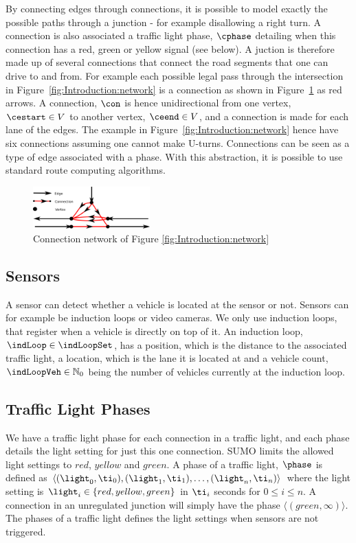 By connecting edges through connections, it is possible to model exactly the possible paths through a junction - for example disallowing a right turn.
A connection is also associated a traffic light phase, $\cphase$ detailing when this connection has a red, green or yellow signal (see below).
A juction is therefore made up of several connections that connect the road segments that one can drive to and from.
For example each possible legal pass through the intersection in Figure~\ref{fig:Introduction:network} is a connection as shown in Figure~\ref{fig:Model:Connection} as red arrows. 
A connection, $\con$ is hence unidirectional from one vertex, $\cestart\in V$ to another vertex, $\ceend \in V$, and a connection is made for each lane of the edges.
The example in Figure~\ref{fig:Introduction:network} hence have six connections assuming one cannot make U-turns.
Connections can be seen as a type of edge associated with a phase.
With this abstraction, it is possible to use standard route computing algorithms.

\begin{figure}[h]
\centering
\includegraphics[width=0.4\textwidth]{../images/ConnectionNetwork.png}
\caption{Connection network of Figure \ref{fig:Introduction:network}}
\label{fig:Model:Connection}
\end{figure}

\subsection{Sensors}%
A sensor can detect whether a vehicle is located at the sensor or not. 
Sensors can for example be induction loops or video cameras.
We only use induction loops, that register when a vehicle is directly on top of it. 
An induction loop, $\indLoop\in\indLoopSet$, has a position, \indLoopPos which is the distance to the associated traffic light, a location, \indLoopLoc which is the lane it is located at and a vehicle count, $\indLoopVeh\in \mathbb{N}_0$ being the number of vehicles currently at the induction loop.

\subsection{Traffic Light Phases}
We have a traffic light phase for each connection in a traffic light, and each phase details the light setting for just this one connection.
SUMO limits the allowed light settings to $red$, $yellow$ and $green$.
A phase of a traffic light, $\phase$ is defined as $\langle(\light_0, \ti_0),(\light_1, \ti_1),\dots, (\light_n, \ti_n) \rangle$ where the light setting is $\light_i\in \{red, yellow, green\}$ in $\ti_i$ seconds for $0 \leq i \leq n$.
A connection in an unregulated junction will simply have the phase $\langle(green, \infty)\rangle$.
The phases of a traffic light defines the light settings when sensors are not triggered. 

